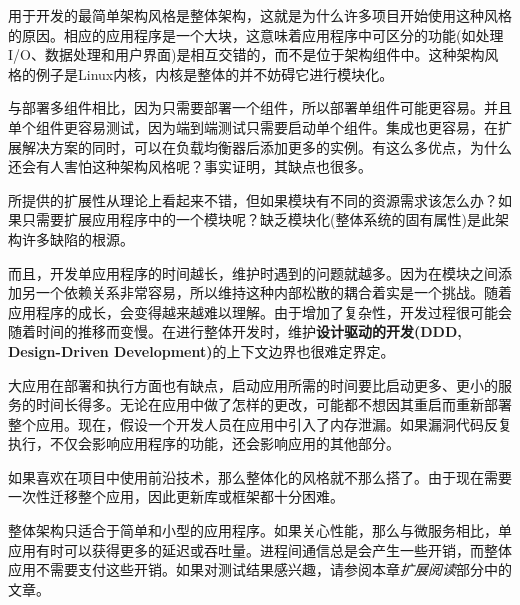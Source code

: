 用于开发的最简单架构风格是整体架构，这就是为什么许多项目开始使用这种风格的原因。相应的应用程序是一个大块，这意味着应用程序中可区分的功能(如处理I/O、数据处理和用户界面)是相互交错的，而不是位于架构组件中。这种架构风格的例子是Linux内核，内核是整体的并不妨碍它进行模块化。

与部署多组件相比，因为只需要部署一个组件，所以部署单组件可能更容易。并且单个组件更容易测试，因为端到端测试只需要启动单个组件。集成也更容易，在扩展解决方案的同时，可以在负载均衡器后添加更多的实例。有这么多优点，为什么还会有人害怕这种架构风格呢？事实证明，其缺点也很多。

所提供的扩展性从理论上看起来不错，但如果模块有不同的资源需求该怎么办？如果只需要扩展应用程序中的一个模块呢？缺乏模块化(整体系统的固有属性)是此架构许多缺陷的根源。

而且，开发单应用程序的时间越长，维护时遇到的问题就越多。因为在模块之间添加另一个依赖关系非常容易，所以维持这种内部松散的耦合着实是一个挑战。随着应用程序的成长，会变得越来越难以理解。由于增加了复杂性，开发过程很可能会随着时间的推移而变慢。在进行整体开发时，维护\textbf{设计驱动的开发(DDD, Design-Driven Development)}的上下文边界也很难定界定。

大应用在部署和执行方面也有缺点，启动应用所需的时间要比启动更多、更小的服务的时间长得多。无论在应用中做了怎样的更改，可能都不想因其重启而重新部署整个应用。现在，假设一个开发人员在应用中引入了内存泄漏。如果漏洞代码反复执行，不仅会影响应用程序的功能，还会影响应用的其他部分。

如果喜欢在项目中使用前沿技术，那么整体化的风格就不那么搭了。由于现在需要一次性迁移整个应用，因此更新库或框架都十分困难。

整体架构只适合于简单和小型的应用程序。如果关心性能，那么与微服务相比，单应用有时可以获得更多的延迟或吞吐量。进程间通信总是会产生一些开销，而整体应用不需要支付这些开销。如果对测试结果感兴趣，请参阅本章\textit{扩展阅读}部分中的文章。






















